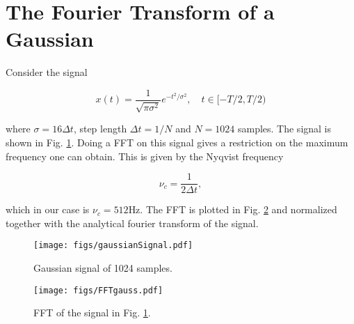 \section{The Fourier Transform of a Gaussian}

Consider the signal

\begin{equation}
  \label{eq:gauss}
  x(t) = \frac{1}{\sqrt{\pi \sigma^2}} e^{-t^2/\sigma^2}, \quad t \in [-T/2,T/2)
\end{equation}

where $\sigma = 16 \Delta t$, step length $\Delta t = 1/N$ and $N = 1024$ samples. The signal is shown in Fig. \ref{fig:gaussSignal}. Doing a FFT on this signal gives a restriction on the maximum frequency one can obtain. This is given by the Nyqvist frequency

\begin{equation*}
  \nu_c = \frac{1}{2\Delta t},
\end{equation*}

which in our case is $\nu_c = 512$Hz. The FFT is plotted in Fig. \ref{fig:FFTgauss} and normalized together with the analytical fourier transform of the signal.

\begin{figure}[H]
  \centering
  \texttt{[image: figs/gaussianSignal.pdf]}
  \caption{Gaussian signal of 1024 samples.}
  \label{fig:gaussSignal}
\end{figure}


\begin{figure}[H]
  \centering
  \texttt{[image: figs/FFTgauss.pdf]}
  \caption{FFT of the signal in Fig. \ref{fig:gaussSignal}.}
  \label{fig:FFTgauss}
\end{figure}
